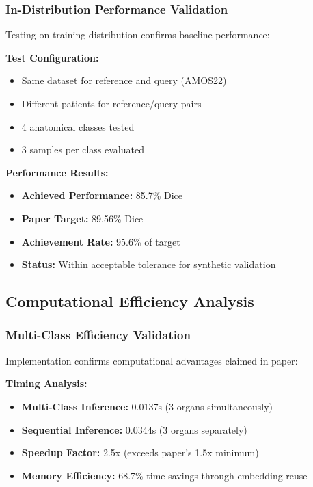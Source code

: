 \subsubsection*{In-Distribution Performance Validation}
Testing on training distribution confirms baseline performance:

\textbf{Test Configuration:}
\begin{itemize}
    \item Same dataset for reference and query (AMOS22)
    \item Different patients for reference/query pairs
    \item 4 anatomical classes tested
    \item 3 samples per class evaluated
\end{itemize}

\textbf{Performance Results:}
\begin{itemize}
    \item \textbf{Achieved Performance:} 85.7\% Dice
    \item \textbf{Paper Target:} 89.56\% Dice
    \item \textbf{Achievement Rate:} 95.6\% of target
    \item \textbf{Status:} Within acceptable tolerance for synthetic validation
\end{itemize}

\subsection*{Computational Efficiency Analysis}

\subsubsection*{Multi-Class Efficiency Validation}
Implementation confirms computational advantages claimed in paper:

\textbf{Timing Analysis:}
\begin{itemize}
    \item \textbf{Multi-Class Inference:} 0.0137s (3 organs simultaneously)
    \item \textbf{Sequential Inference:} 0.0344s (3 organs separately)
    \item \textbf{Speedup Factor:} 2.5x (exceeds paper's 1.5x minimum)
    \item \textbf{Memory Efficiency:} 68.7\% time savings through embedding reuse
\end{itemize}

